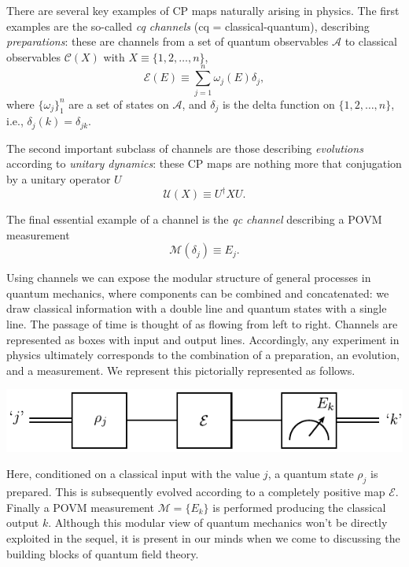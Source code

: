 \documentclass[11pt]{amsart}
\theoremstyle{plain}%
\theoremstyle{definition}
\theoremstyle{remark}
\begin{document}
There are several key examples of CP maps naturally arising in physics.  The first examples are the so-called \emph{cq channels} (cq = classical-quantum), describing \emph{preparations}: these are channels from a set of quantum observables $\mathcal{A}$ to classical observables $\mathcal{C}(X)$ with $X \equiv \{1,2,\ldots, n\}$,
\begin{equation}
	\mathcal{E}(E) \equiv \sum_{j = 1}^n \omega_j (E) \delta_j,
\end{equation}
where $\{\omega_j\}_1^{n}$ are a set of states on $\mathcal{A}$, and $\delta_j$ is the delta function on $\{1,2,\ldots, n\}$, i.e., $\delta_j(k) = \delta_{jk}$. 

The second important subclass of channels are those describing \emph{evolutions} according to \emph{unitary dynamics}: these CP maps are nothing more that conjugation by a unitary operator $U$
\begin{equation}
	\mathcal{U}(X) \equiv U^\dag X U.
\end{equation}

The final essential example of a channel is the \emph{qc channel} describing a POVM measurement
\begin{equation}
	\mathcal{M}(\delta_j) \equiv E_j.
\end{equation}

Using channels we can expose the modular structure of general processes in quantum mechanics, where components can be combined and concatenated: we draw classical information with a double line and quantum states with a single line. The passage of time is thought of as flowing from left to right. Channels are represented as boxes with input and output lines. Accordingly, any experiment in physics ultimately corresponds to the combination of a preparation, an evolution, and a measurement. We represent this pictorially represented as follows.
\begin{center}
\includegraphics{prepevolvemeasure.pdf}
\end{center}
Here, conditioned on a classical input with the value $j$, a quantum state $\rho_j$ is prepared. This is subsequently evolved according to a completely positive map $\mathcal{E}$. Finally a POVM measurement $\mathcal{M} = \{E_k\}$ is performed producing the classical output $k$. Although this modular view of quantum mechanics won't be directly exploited in the sequel, it is present in our minds when we come to discussing the building blocks of quantum field theory. 
\end{document}
